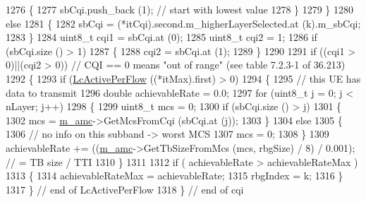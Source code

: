\begin{DoxyCode}
1276                     \{
1277                       sbCqi.push\_back (1);  \textcolor{comment}{// start with lowest value}
1278                     \}
1279                 \}
1280               \textcolor{keywordflow}{else}
1281                 \{
1282                   sbCqi = (*itCqi).second.m\_higherLayerSelected.at (k).m\_sbCqi;
1283                 \}
1284               uint8\_t cqi1 = sbCqi.at (0);
1285               uint8\_t cqi2 = 1;
1286               \textcolor{keywordflow}{if} (sbCqi.size () > 1)
1287                 \{
1288                   cqi2 = sbCqi.at (1);
1289                 \}
1290           
1291               \textcolor{keywordflow}{if} ((cqi1 > 0)||(cqi2 > 0)) \textcolor{comment}{// CQI == 0 means "out of range" (see table 7.2.3-1 of 36.213)}
1292                 \{
1293                   \textcolor{keywordflow}{if} (\hyperlink{classns3_1_1FdTbfqFfMacScheduler_a606f29c62ab153d6a584da5371070045}{LcActivePerFlow} ((*itMax).first) > 0)
1294                     \{
1295                       \textcolor{comment}{// this UE has data to transmit}
1296                       \textcolor{keywordtype}{double} achievableRate = 0.0;
1297                       \textcolor{keywordflow}{for} (uint8\_t j = 0; j < nLayer; j++) 
1298                         \{
1299                           uint8\_t mcs = 0; 
1300                           \textcolor{keywordflow}{if} (sbCqi.size () > j)
1301                             \{                       
1302                               mcs = \hyperlink{classns3_1_1FdTbfqFfMacScheduler_a53e0bcb714cd32ee639f7b4e7265087c}{m\_amc}->GetMcsFromCqi (sbCqi.at (j));
1303                             \}
1304                           \textcolor{keywordflow}{else}
1305                             \{
1306                               \textcolor{comment}{// no info on this subband -> worst MCS}
1307                               mcs = 0;
1308                             \}
1309                           achievableRate += ((\hyperlink{classns3_1_1FdTbfqFfMacScheduler_a53e0bcb714cd32ee639f7b4e7265087c}{m\_amc}->GetTbSizeFromMcs (mcs, rbgSize) / 8) / 0.001); \textcolor{comment}{//
       = TB size / TTI}
1310                         \}
1311 
1312                       \textcolor{keywordflow}{if} ( achievableRate > achievableRateMax )
1313                         \{
1314                           achievableRateMax = achievableRate;
1315                           rbgIndex = k;
1316                         \}
1317                       \}  \textcolor{comment}{// end of LcActivePerFlow}
1318                     \}  \textcolor{comment}{// end of cqi}

\end{DoxyCode}
